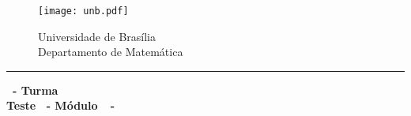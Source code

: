 \documentclass[12pt]{exam}
\begin{document}
    \begin{figure}[h]
        \begin{minipage}[c]{1.7cm}
            \texttt{[image: unb.pdf]}
        \end{minipage}
        \hspace{0pt}
        \begin{minipage}[c]{4in}
            {Universidade de Brasília} \\
            {Departamento de Matemática}
        \end{minipage}
    \end{figure}
    \hrule
    \begin{center}
        {\Large\bf \disciplina\ - Turma \turma}  \\
         {\large\bf Teste \numeroteste\ - Módulo\ \modulo\ -\ \dataavaliacao}
    \end{center}

    \\
    \vspace*{.01cm}

    \vspace{.4cm}
\end{document}
